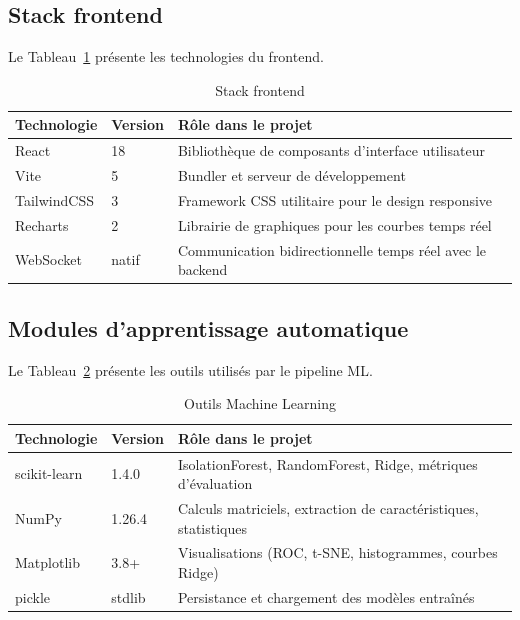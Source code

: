 \subsection{Stack frontend}

Le Tableau~\ref{tab:stack_frontend} présente les technologies du frontend.

\begin{table}[htbp]
\centering
\renewcommand{\arraystretch}{1.45}
\caption{Stack frontend} 
\label{tab:stack_frontend}
\begin{tabular}{|p{}|p{}|p{}|}
\hline
\rowcolor{gray!25}
\textbf{Technologie} & \textbf{Version} & \textbf{Rôle dans le projet} \\
\hline
React & 18 & Bibliothèque de composants d'interface utilisateur \\
\hline
Vite & 5 & Bundler et serveur de développement \\
\hline
TailwindCSS & 3 & Framework CSS utilitaire pour le design responsive \\
\hline
Recharts & 2 & Librairie de graphiques pour les courbes temps réel \\
\hline
WebSocket & natif & Communication bidirectionnelle temps réel avec le backend \\
\hline
\end{tabular}
\end{table}

\subsection{Modules d'apprentissage automatique}

Le Tableau~\ref{tab:stack_ml} présente les outils utilisés par le pipeline ML.

\begin{table}[htbp]
\centering
\renewcommand{\arraystretch}{1.45}
\caption{Outils Machine Learning}
\label{tab:stack_ml}
\begin{tabular}{|p{}|p{}|p{}|}
\hline
\rowcolor{gray!25}
\textbf{Technologie} & \textbf{Version} & \textbf{Rôle dans le projet} \\
\hline
scikit-learn & 1.4.0 & IsolationForest, RandomForest, Ridge, métriques d'évaluation \\
\hline
NumPy & 1.26.4 & Calculs matriciels, extraction de caractéristiques, statistiques \\
\hline
Matplotlib & 3.8+ & Visualisations (ROC, t-SNE, histogrammes, courbes Ridge) \\
\hline
pickle & stdlib & Persistance et chargement des modèles entraînés \\
\hline
\end{tabular}
\end{table}

